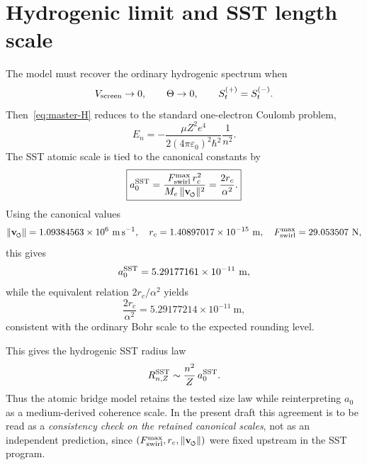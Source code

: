 \documentclass[11pt,a4paper]{article}
\newcommand{\swirlarrow}{\mathchoice{\mkern-2mu\scriptstyle\boldsymbol{\circlearrowleft}}{\mkern-2mu\scriptstyle\boldsymbol{\circlearrowleft}}{\mkern-2mu\scriptscriptstyle\boldsymbol{\circlearrowleft}}{\mkern-2mu\scriptscriptstyle\boldsymbol{\circlearrowleft}}}
\newcommand{\vswirl}{\mathbf{v}_{\swirlarrow}}
\newcommand{\rc}{r_c}
\begin{document}
\section{Hydrogenic limit and SST length scale}
The model must recover the ordinary hydrogenic spectrum when
\begin{equation}
V_{\rm screen}\to 0,
\qquad
\Theta\to 0,
\qquad
S_t^{(+)}=S_t^{(-)}.
\end{equation}
Then~\eqref{eq:master-H} reduces to the standard one-electron Coulomb problem,
\begin{equation}
\label{eq:En}
E_n=-\frac{\mu Z^2 e^4}{2(4\pi\varepsilon_0)^2\hbar^2}\frac{1}{n^2}.
\end{equation}
The SST atomic scale is tied to the canonical constants by
\begin{equation}
\label{eq:a0-sst}
\boxed{
a_0^{\rm SST}
=
\frac{F_{\rm swirl}^{\max}\,\rc^2}{M_e\,\lVert\vswirl\rVert^2}
=
\frac{2\rc}{\alpha^2}.
}
\end{equation}
Using the canonical values
\begin{equation}
\lVert\vswirl\rVert = 1.09384563\times 10^6\ \mathrm{m\,s^{-1}},
\quad
\rc = 1.40897017\times 10^{-15}\ \mathrm{m},
\quad
F_{\rm swirl}^{\max}=29.053507\ \mathrm{N},
\end{equation}
this gives
\begin{equation}
\label{eq:a0-num}
a_0^{\rm SST}
=
5.29177161\times 10^{-11}\ \mathrm{m},
\end{equation}
while the equivalent relation $2\rc/\alpha^2$ yields
\begin{equation}
\label{eq:a0-num2}
\frac{2\rc}{\alpha^2}=5.29177214\times 10^{-11}\ \mathrm{m},
\end{equation}
consistent with the ordinary Bohr scale to the expected rounding level.

This gives the hydrogenic SST radius law
\begin{equation}
\label{eq:RnZ}
R_{n,Z}^{\rm SST}\sim \frac{n^2}{Z}\,a_0^{\rm SST}.
\end{equation}
Thus the atomic bridge model retains the tested size law while reinterpreting $a_0$ as a medium-derived coherence scale. In the present draft this agreement is to be read as a \emph{consistency check on the retained canonical scales}, not as an independent prediction, since $(F_{\rm swirl}^{\max},\rc,\lVert\vswirl\rVert)$ were fixed upstream in the SST program.
\end{document}
